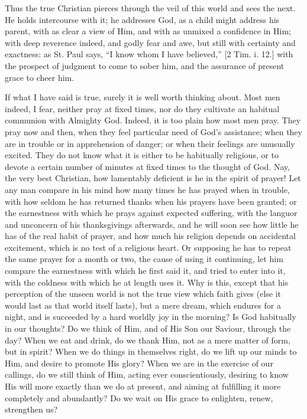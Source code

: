 Thus the true Christian pierces through the veil of this world and
sees the next. He holds intercourse with it; he addresses God, as a
child might address his parent, with as clear a view of Him, and with
as unmixed a confidence in Him; with deep reverence indeed, and godly
fear and awe, but still with certainty and exactness: as St. Paul
says, ``I know whom I have believed,'' [2 Tim. i. 12.] with
the prospect of judgment to come to sober him, and the assurance of
present grace to cheer him.

If what I have said is true, surely it is well worth thinking
about. Most men indeed, I fear, neither pray at fixed times, nor do
they cultivate an habitual communion with Almighty God. Indeed, it is
too plain how most men pray. They pray now and then, when they feel
particular need of God's assistance; when they are in trouble or in
apprehension of danger; or when their feelings are unusually excited.
They do not know what it is either to be habitually religious, or to
devote a certain number of minutes at fixed times to the thought of
God. Nay, the very best Christian, how lamentably deficient is he in
the spirit of prayer! Let any man compare in his mind how many times
he has prayed when in trouble, with how seldom he has returned thanks
when his prayers have been granted; or the earnestness with which he
prays against expected suffering, with the languor and unconcern of
his thanksgivings afterwards, and he will soon see how little he has
of the real habit of prayer, and how much his religion depends on
accidental excitement, which is no test of a religious heart. Or
supposing he has to repeat the same prayer for a month or two, the
cause of using it continuing, let him compare the earnestness with
which he first said it, and tried to enter into it, with the coldness
with which he at length uses it. Why is this, except that his
perception of the unseen world is not the true view which faith gives
(else it would last as that world itself lasts), but a mere dream,
which endures for a night, and is succeeded by a hard worldly joy in
the morning? Is God habitually in our thoughts? Do we think of Him,
and of His Son our Saviour, through the day? When we eat and drink, do
we thank Him, not as a mere matter of form, but in spirit? When we do
things in themselves right, do we lift up our minds to Him, and desire
to promote His glory? When we are in the exercise of our callings, do
we still think of Him, acting ever conscientiously, desiring to know
His will more exactly than we do at present, and aiming at fulfilling
it more completely and abundantly? Do we wait on His grace to
enlighten, renew, strengthen us?

